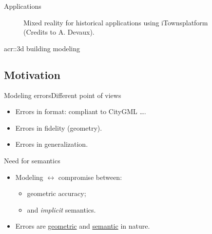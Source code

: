 \documentclass[10pt]{beamer}
\begin{document}
\begin{frame}{Applications}
{\begin{figure}[H]
                        \caption{Mixed reality for historical applications using iTowns\footnotemark platform (Credits to A. Devaux\footnotemark).}
                    \end{figure}
                    \addtocounter{footnote}{1}
                }
            \end{frame}

            \begin{frame}{\texorpdfstring{\acrshort*{acr::3d}}{3D} building modeling}
                \centering
                
            \end{frame}

        \subsection{Motivation}
            \begin{frame}{Modeling errors}{Different point of views}
                \begin{itemize}[label=\(\blacktriangleright\), font=\color{IGNGreen}]
                    \item<1-> Errors in format: compliant to CityGML \dots.
                    \item<2-> Errors in fidelity (geometry).
                    \item<3-> Errors in generalization.
                \end{itemize}
            \end{frame}

            \begin{frame}{Need for semantics}
                \begin{itemize}[label=\(\blacktriangleright\), font=\color{IGNGreen}]
                    \item<1-> Modeling \(\longleftrightarrow\) compromise between:
                    \begin{itemize}[label=\(\blacktriangleright\), font=\color{IGNGreen}]
                        \item<2-> geometric accuracy;
                        \item<3-> and \textit{implicit} semantics.
                    \end{itemize}
                    \item<4-> Errors are \underline{geometric} and \underline{semantic} in nature.
                \end{itemize}
            \end{frame}
        
\end{document}
